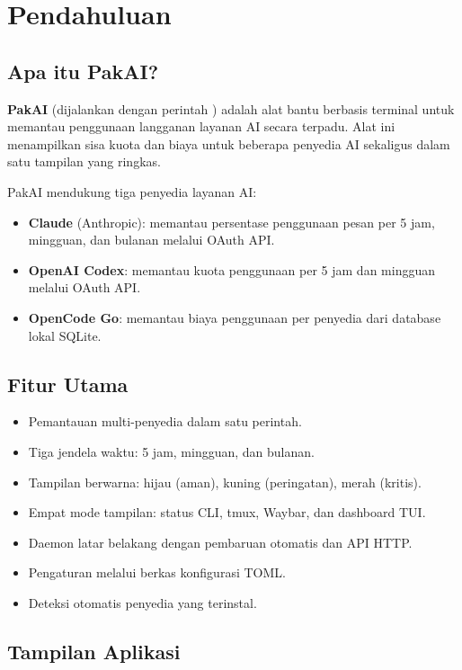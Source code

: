 \chapter{Pendahuluan}

\section{Apa itu PakAI?}

\textbf{PakAI} (dijalankan dengan perintah ) adalah alat bantu berbasis terminal
untuk memantau penggunaan langganan layanan AI secara terpadu. Alat ini menampilkan
sisa kuota dan biaya untuk beberapa penyedia AI sekaligus dalam satu tampilan yang
ringkas.

PakAI mendukung tiga penyedia layanan AI:

\begin{itemize}
  \item \textbf{Claude} (Anthropic): memantau persentase penggunaan pesan per 5 jam,
        mingguan, dan bulanan melalui OAuth API.
  \item \textbf{OpenAI Codex}: memantau kuota penggunaan per 5 jam dan mingguan
        melalui OAuth API.
  \item \textbf{OpenCode Go}: memantau biaya penggunaan per penyedia dari
        database lokal SQLite.
\end{itemize}

\section{Fitur Utama}

\begin{itemize}
  \item Pemantauan multi-penyedia dalam satu perintah.
  \item Tiga jendela waktu: 5 jam, mingguan, dan bulanan.
  \item Tampilan berwarna: hijau (aman), kuning (peringatan), merah (kritis).
  \item Empat mode tampilan: status CLI, tmux, Waybar, dan dashboard TUI.
  \item Daemon latar belakang dengan pembaruan otomatis dan API HTTP.
  \item Pengaturan melalui berkas konfigurasi TOML.
  \item Deteksi otomatis penyedia yang terinstal.
\end{itemize}

\section{Tampilan Aplikasi}

